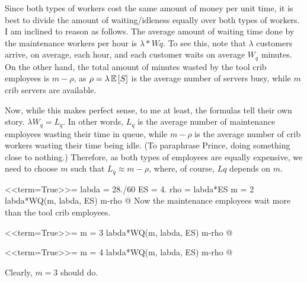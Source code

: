 \begin{question}
\begin{solution}
\begin{enumerate}
Since both types of workers cost the same amount of money per unit
time, it is best to divide the amount of waiting/idleness equally over
both types of workers.  I am inclined to reason as follows. The
average amount of waiting time done by the maintenance workers per
hour is $\lambda * Wq$. To see this, note that $\lambda$
customers arrive, on average, each hour, and each customer waits on
average $W_q$ minutes. On the other hand, the total amount of
minutes wasted by the tool crib employees is $m-\rho$, as
$\rho = \lambda \,\mathbb{E}\left[S\right]$ is the average number of servers busy,
while $m$ crib servers are available.

Now, while this makes perfect sense, to me at least, the formulas tell
their own story. $\lambda W_q = L_q$. In other words,
$L_q$ is the average number of maintenance employees wasting
their time in queue, while $m -\rho$ is the average number of
crib workers wasting their time being idle. (To paraphrase Prince,
doing something close to nothing.) Therefore, as both types of
employees are equally expensive, we need to choose $m$ such that
$L_q \approx m- \rho$, where, of course, $Lq$ depends on
$m$.

<<term=True>>=
labda = 28./60
ES = 4.
rho = labda*ES
m = 2
labda*WQ(m, labda, ES)
m-rho
@ 
Now the maintenance employees wait more than the tool crib employees.

<<term=True>>=
m = 3
labda*WQ(m, labda, ES)
m-rho
@ 

<<term=True>>=
m = 4
labda*WQ(m, labda, ES)
m-rho
@ 

Clearly, $m=3$ should do.
  \end{enumerate}
    \end{solution}
\end{question}

